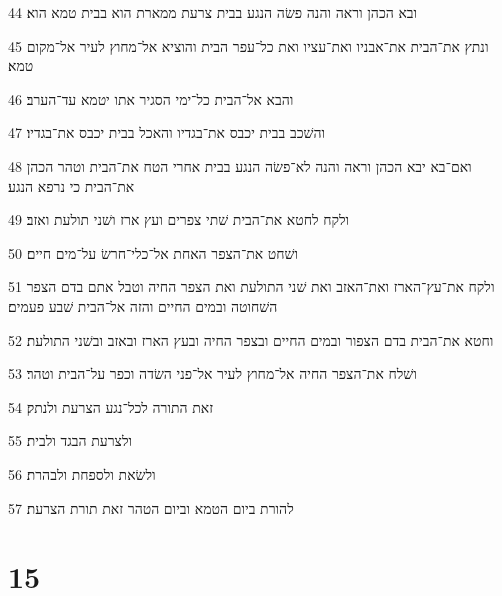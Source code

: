 \par 44 ובא הכהן וראה והנה פשׂה הנגע בבית צרעת ממארת הוא בבית טמא הוא׃
\par 45 ונתץ את־הבית את־אבניו ואת־עציו ואת כל־עפר הבית והוציא אל־מחוץ לעיר אל־מקום טמא׃
\par 46 והבא אל־הבית כל־ימי הסגיר אתו יטמא עד־הערב׃
\par 47 והשׁכב בבית יכבס את־בגדיו והאכל בבית יכבס את־בגדיו׃
\par 48 ואם־בא יבא הכהן וראה והנה לא־פשׂה הנגע בבית אחרי הטח את־הבית וטהר הכהן את־הבית כי נרפא הנגע׃
\par 49 ולקח לחטא את־הבית שׁתי צפרים ועץ ארז ושׁני תולעת ואזב׃
\par 50 ושׁחט את־הצפר האחת אל־כלי־חרשׂ על־מים חיים׃
\par 51 ולקח את־עץ־הארז ואת־האזב ואת שׁני התולעת ואת הצפר החיה וטבל אתם בדם הצפר השׁחוטה ובמים החיים והזה אל־הבית שׁבע פעמים׃
\par 52 וחטא את־הבית בדם הצפור ובמים החיים ובצפר החיה ובעץ הארז ובאזב ובשׁני התולעת׃
\par 53 ושׁלח את־הצפר החיה אל־מחוץ לעיר אל־פני השׂדה וכפר על־הבית וטהר׃
\par 54 זאת התורה לכל־נגע הצרעת ולנתק׃
\par 55 ולצרעת הבגד ולבית׃
\par 56 ולשׂאת ולספחת ולבהרת׃
\par 57 להורת ביום הטמא וביום הטהר זאת תורת הצרעת׃

\chapter{15}

